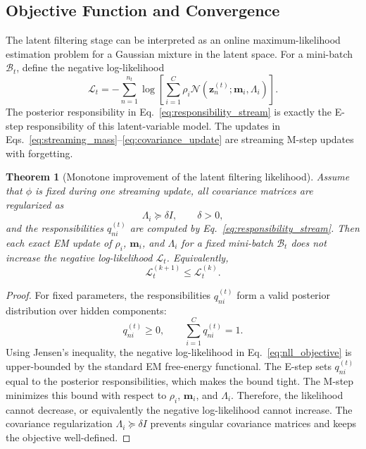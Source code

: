 \documentclass{article}
\theoremstyle{plain}
\newtheorem{theorem}{Theorem}
\theoremstyle{definition}
\theoremstyle{remark}
\begin{document}
\subsection{Objective Function and Convergence}
\label{subsec:objective_convergence}

The latent filtering stage can be interpreted as an online maximum-likelihood estimation problem for a Gaussian mixture in the latent space. For a mini-batch \(\mathcal B_t\), define the negative log-likelihood
\begin{equation}
	\label{eq:nll_objective}
	\mathcal L_t
	=
	-
	\sum_{n=1}^{n_t}
	\log
	\left[
	\sum_{i=1}^{C}
	\rho_i
	\mathcal N(\mathbf z_n^{(t)};\mathbf m_i,\Lambda_i)
	\right].
\end{equation}
The posterior responsibility in Eq.~\eqref{eq:responsibility_stream} is exactly the E-step responsibility of this latent-variable model. The updates in Eqs.~\eqref{eq:streaming_mass}--\eqref{eq:covariance_update} are streaming M-step updates with forgetting.

\begin{theorem}[Monotone improvement of the latent filtering likelihood]
	\label{thm:monotone_likelihood}
	Assume that \(\phi\) is fixed during one streaming update, all covariance matrices are regularized as
	\[
	\Lambda_i\succeq \delta I,
	\qquad
	\delta>0,
	\]
	and the responsibilities \(q_{ni}^{(t)}\) are computed by Eq.~\eqref{eq:responsibility_stream}. Then each exact EM update of \(\rho_i\), \(\mathbf m_i\), and \(\Lambda_i\) for a fixed mini-batch \(\mathcal B_t\) does not increase the negative log-likelihood \(\mathcal L_t\). Equivalently,
	\[
	\mathcal L_t^{(k+1)}
	\leq
	\mathcal L_t^{(k)}.
	\]
\end{theorem}

\begin{proof}
	For fixed parameters, the responsibilities \(q_{ni}^{(t)}\) form a valid posterior distribution over hidden components:
	\[
	q_{ni}^{(t)}\geq 0,
	\qquad
	\sum_{i=1}^{C}q_{ni}^{(t)}=1.
	\]
	Using Jensen's inequality, the negative log-likelihood in Eq.~\eqref{eq:nll_objective} is upper-bounded by the standard EM free-energy functional. The E-step sets \(q_{ni}^{(t)}\) equal to the posterior responsibilities, which makes the bound tight. The M-step minimizes this bound with respect to \(\rho_i\), \(\mathbf m_i\), and \(\Lambda_i\). Therefore, the likelihood cannot decrease, or equivalently the negative log-likelihood cannot increase. The covariance regularization \(\Lambda_i\succeq\delta I\) prevents singular covariance matrices and keeps the objective well-defined.
\end{proof}
\end{document}

